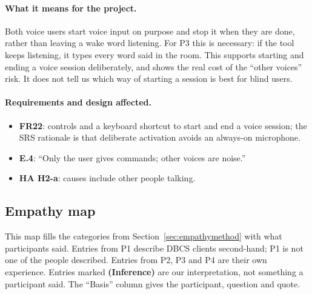 \documentclass[12pt, titlepage]{article}
\newcommand{\means}{\paragraph{What it means for the project.}}
\newcommand{\affects}{\paragraph{Requirements and design affected.}}
\begin{document}
\means
Both voice users start voice input on purpose and stop it when they are done, rather than leaving a wake word listening. For P3 this is necessary: if the tool keeps listening, it types every word said in the room. This supports starting and ending a voice session deliberately, and shows the real cost of the ``other voices'' risk. It does not tell us which way of starting a session is best for blind users.

\affects
\begin{itemize}
    \item \textbf{FR22}: controls and a keyboard shortcut to start and end a voice session; the SRS rationale is that deliberate activation avoids an always-on microphone.
    \item \textbf{E.4}: ``Only the user gives commands; other voices are noise.''
    \item \textbf{HA H2-a}: causes include other people talking.
\end{itemize}

\subsection{Empathy map}\label{sec:empathy}

This map fills the categories from Section~\ref{sec:empathymethod} with what participants said. Entries from P1 describe DBCS clients second-hand; P1 is not one of the people described. Entries from P2, P3 and P4 are their own experience. Entries marked \textbf{(Inference)} are our interpretation, not something a participant said. The ``Basis'' column gives the participant, question and quote.
\end{document}
